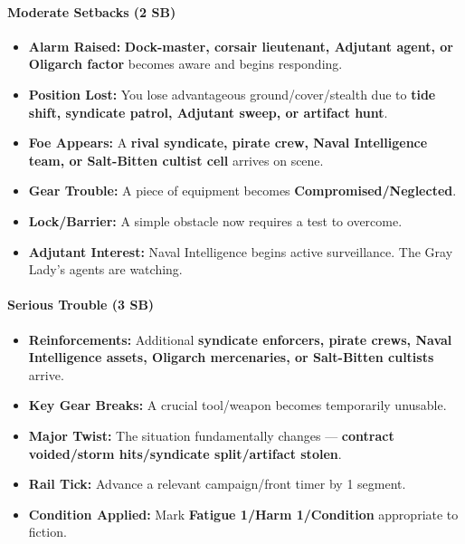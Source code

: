 \paragraph{Moderate Setbacks (2 SB)}
\begin{itemize}
\item \textbf{Alarm Raised:} \textbf{Dock-master, corsair lieutenant, Adjutant agent, or Oligarch factor} becomes aware and begins responding.
\item \textbf{Position Lost:} You lose advantageous ground/cover/stealth due to \textbf{tide shift, syndicate patrol, Adjutant sweep, or artifact hunt}.
\item \textbf{Foe Appears:} A \textbf{rival syndicate, pirate crew, Naval Intelligence team, or Salt-Bitten cultist cell} arrives on scene.
\item \textbf{Gear Trouble:} A piece of equipment becomes \textbf{Compromised/Neglected}.
\item \textbf{Lock/Barrier:} A simple obstacle now requires a test to overcome.
\item \textbf{Adjutant Interest:} Naval Intelligence begins active surveillance. The Gray Lady's agents are watching.
\end{itemize}

\paragraph{Serious Trouble (3 SB)}
\begin{itemize}
\item \textbf{Reinforcements:} Additional \textbf{syndicate enforcers, pirate crews, Naval Intelligence assets, Oligarch mercenaries, or Salt-Bitten cultists} arrive.
\item \textbf{Key Gear Breaks:} A crucial tool/weapon becomes temporarily unusable.
\item \textbf{Major Twist:} The situation fundamentally changes --- \textbf{contract voided/storm hits/syndicate split/artifact stolen}.
\item \textbf{Rail Tick:} Advance a relevant campaign/front timer by 1 segment.
\item \textbf{Condition Applied:} Mark \textbf{Fatigue 1/Harm 1/Condition} appropriate to fiction.
\end{itemize}

